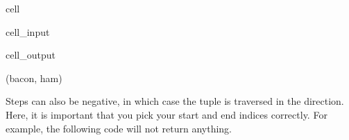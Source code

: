 \documentclass[letterpaper,10pt,english]{jupyterBook}
\begin{document}
\begin{sphinxuseclass}{cell}\begin{sphinxVerbatimInput}

\begin{sphinxuseclass}{cell_input}
\begin{sphinxVerbatim}[commandchars=\\\{\}]
\PYG{p}{[}\PYG{p}{]}
\end{sphinxVerbatim}

\end{sphinxuseclass}\end{sphinxVerbatimInput}
\begin{sphinxVerbatimOutput}

\begin{sphinxuseclass}{cell_output}
\begin{sphinxVerbatim}[commandchars=\\\{\}]
(\PYGZsq{}bacon\PYGZsq{}, \PYGZsq{}ham\PYGZsq{})
\end{sphinxVerbatim}

\end{sphinxuseclass}\end{sphinxVerbatimOutput}

\end{sphinxuseclass}
\sphinxAtStartPar
Steps can also be negative, in which case the tuple is traversed in the  direction. Here, it is important that you pick your start and end indices correctly. For example, the following code will not return anything.
\end{document}
